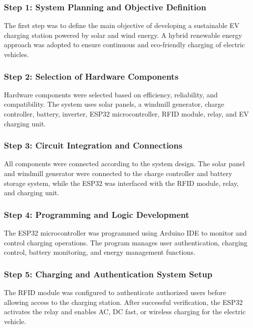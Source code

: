\documentclass[12pt]{report}
\begin{document}
\begin{Certificatepage}
\begin{center}
\begin{justify}
\subsubsection{\textbf{Step 1: System Planning and Objective Definition}}

The first step was to define the main objective of developing a sustainable EV charging station powered by solar and wind energy. A hybrid renewable energy approach was adopted to ensure continuous and eco-friendly charging of electric vehicles.

\subsubsection{\textbf{Step 2: Selection of Hardware Components}}

Hardware components were selected based on efficiency, reliability, and compatibility. The system uses solar panels, a windmill generator, charge controller, battery, inverter, ESP32 microcontroller, RFID module, relay, and EV charging unit.

\subsubsection{\textbf{Step 3: Circuit Integration and Connections}}

All components were connected according to the system design. The solar panel and windmill generator were connected to the charge controller and battery storage system, while the ESP32 was interfaced with the RFID module, relay, and charging unit.

\subsubsection{\textbf{Step 4: Programming and Logic Development}}

The ESP32 microcontroller was programmed using Arduino IDE to monitor and control charging operations. The program manages user authentication, charging control, battery monitoring, and energy management functions.

\subsubsection{\textbf{Step 5: Charging and Authentication System Setup}}

The RFID module was configured to authenticate authorized users before allowing access to the charging station. After successful verification, the ESP32 activates the relay and enables AC, DC fast, or wireless charging for the electric vehicle.


\end{justify}
\end{center}
\end{Certificatepage}
\end{document}
